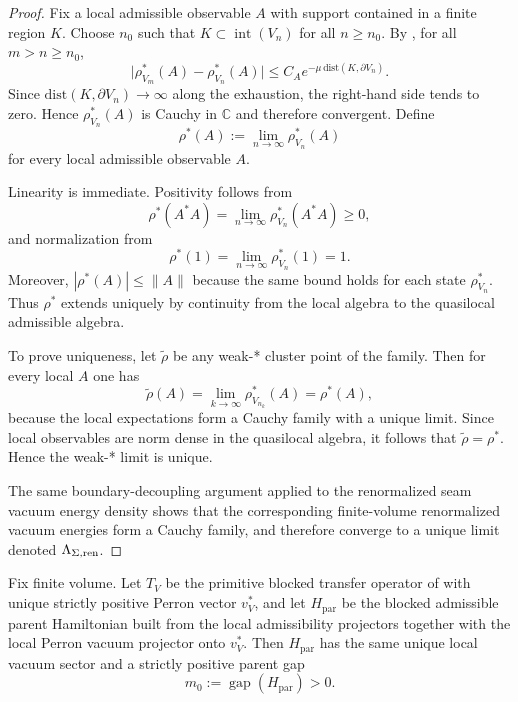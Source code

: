\begin{proof}
Fix a local admissible observable $A$ with support contained in a finite region $K$. Choose $n_0$
such that $K\subset \operatorname{int}(V_n)$ for all $n\ge n_0$. By
, for all $m>n\ge n_0$,
\[
\bigl|\rho^*_{V_m}(A)-\rho^*_{V_n}(A)\bigr|
\le
C_A e^{-\mu\,\mathrm{dist}(K,\partial V_n)}.
\]
Since $\mathrm{dist}(K,\partial V_n)\to\infty$ along the exhaustion, the right-hand side tends to
zero. Hence $\rho^*_{V_n}(A)$ is Cauchy in $\mathbb C$ and therefore convergent. Define
\[
\rho^*(A):=\lim_{n\to\infty}\rho^*_{V_n}(A)
\]
for every local admissible observable $A$.

Linearity is immediate. Positivity follows from
\[
\rho^*(A^*A)=\lim_{n\to\infty}\rho^*_{V_n}(A^*A)\ge 0,
\]
and normalization from
\[
\rho^*(1)=\lim_{n\to\infty}\rho^*_{V_n}(1)=1.
\]
Moreover, $|\rho^*(A)|\le \|A\|$ because the same bound holds for each state $\rho^*_{V_n}$. Thus
$\rho^*$ extends uniquely by continuity from the local algebra to the quasilocal admissible
algebra.

To prove uniqueness, let $\widetilde\rho$ be any weak-* cluster point of the family. Then for every
local $A$ one has
\[
\widetilde\rho(A)=\lim_{k\to\infty}\rho^*_{V_{n_k}}(A)=\rho^*(A),
\]
because the local expectations form a Cauchy family with a unique limit. Since local observables are
norm dense in the quasilocal algebra, it follows that $\widetilde\rho=\rho^*$. Hence the weak-*
limit is unique.

The same boundary-decoupling argument applied to the renormalized seam vacuum energy density shows
that the corresponding finite-volume renormalized vacuum energies form a Cauchy family, and
therefore converge to a unique limit denoted $\Lambda_{\Sigma,\mathrm{ren}}$.
\end{proof}

\begin{lemma}
\label{lem:parent-gap-from-transfer-block}
Fix finite volume. Let $T_V$ be the primitive blocked transfer operator of
 with unique strictly positive Perron vector $v_V^\ast$, and
let $H_{\mathrm{par}}$ be the blocked admissible parent Hamiltonian built from the local
admissibility projectors together with the local Perron vacuum projector onto $v_V^\ast$. Then
$H_{\mathrm{par}}$ has the same unique local vacuum sector and a strictly positive parent gap
\[
m_0:=\operatorname{gap}(H_{\mathrm{par}})>0.
\]
\end{lemma}

